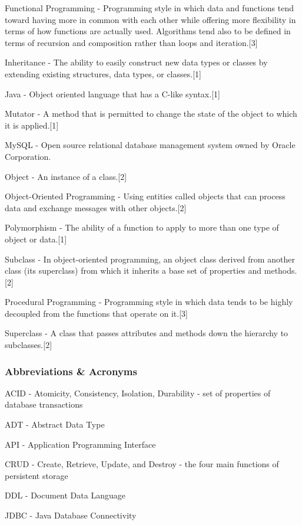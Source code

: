 \documentclass[12pt]{scrartcl} %
\begin{document}
    Functional Programming - Programming style in which data and functions tend toward having more in common with each other while offering more flexibility in terms of how functions are actually used.  Algorithms tend also to be defined in terms of recursion and composition rather than loops and iteration.[3]

    Inheritance - The ability to easily construct new data types or classes by extending existing structures, data types, or classes.[1]

    Java - Object oriented language that has a C-like syntax.[1]

    Mutator - A method that is permitted to change the state of the object to which it is applied.[1]

    MySQL - Open source relational database management system owned by Oracle Corporation.

    Object - An instance of a class.[2]

    Object-Oriented Programming - Using entities called objects that can process data and exchange messages with other objects.[2]

    Polymorphism - The ability of a function to apply to more than one type of object or data.[1]

    Subclass - In object-oriented programming, an object class derived from another class (its superclass) from which it inherits a base set of properties and methods.[2]

    Procedural Programming - Programming style in which data tends to be highly decoupled from the functions that operate on it.[3]

    Superclass - A class that passes attributes and methods down the hierarchy to subclasses.[2]

    \subsubsection{Abbreviations \& Acronyms}

    ACID - Atomicity, Consistency, Isolation, Durability - set of properties of database transactions

    ADT - Abstract Data Type

    API - Application Programming Interface

    CRUD - Create, Retrieve, Update, and Destroy - the four main functions of persistent storage

    DDL - Document Data Language

    JDBC - Java Database Connectivity
\end{document}
